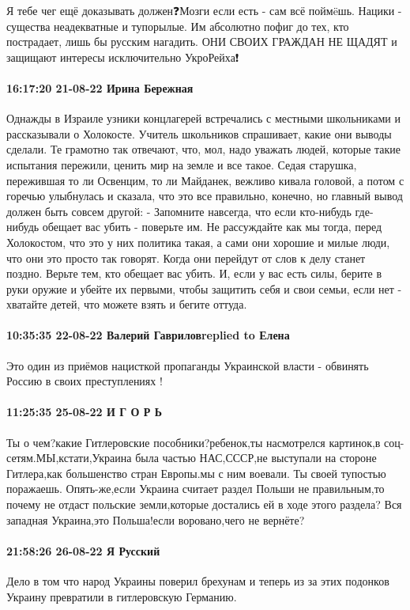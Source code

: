 Я тебе чег ещё доказывать должен❓Мозги если есть - сам всё поймëшь.
Нацики - существа неадекватные и тупорылые. Им абсолютно пофиг до тех, кто пострадает, лишь бы русским нагадить.
ОНИ СВОИХ ГРАЖДАН НЕ ЩАДЯТ и защищают интересы исключительно УкроРейха❗

\paragraph{16:17:20 21-08-22 Ирина Бережная}

Однажды в Израиле узники концлагерей встречались с местными школьниками и рассказывали о Холокосте.
Учитель школьников спрашивает, какие они выводы сделали. Те грамотно так отвечают, что, мол, надо уважать людей, которые такие испытания пережили, ценить мир на земле и все такое.
Седая старушка, пережившая то ли Освенцим, то ли Майданек, вежливо кивала головой, а потом с горечью улыбнулась и сказала, что это все правильно, конечно, но главный вывод должен быть совсем другой:
- Запомните навсегда, что если кто-нибудь где-нибудь обещает вас убить - поверьте им. Не рассуждайте как мы тогда, перед Холокостом, что это у них политика такая, а сами они хорошие и милые люди, что они это просто так говорят. Когда они перейдут от слов к делу станет поздно. Верьте тем, кто обещает вас убить. И, если у вас есть силы, берите в руки оружие и убейте их первыми, чтобы защитить себя и свои семьи, если нет - хватайте детей, что можете взять и бегите оттуда.

\paragraph{10:35:35 22-08-22 Валерий Гавриловreplied to Елена}

Это один из приёмов нацисткой пропаганды Украинской власти - обвинять Россию в
своих преступлениях !

\paragraph{11:25:35 25-08-22 И Г О Р Ь}

Ты о чем?какие Гитлеровские пособники?ребенок,ты насмотрелся картинок,в
соц-сетям.МЫ,кстати,Украина была частью НАС,СССР,не выступали на стороне
Гитлера,как большенство стран Европы.мы с ним воевали. Ты своей тупостью
поражаешь. Опять-же,если Украина считает раздел Польши не правильным,то почему
не отдаст польские земли,которые достались ей в ходе этого раздела? Вся
западная Украина,это Польша!если воровано,чего не вернёте?

\paragraph{21:58:26 26-08-22 Я Русский}

Дело в том что народ Украины поверил брехунам и теперь из за этих подонков
Украину превратили в гитлеровскую Германию.

